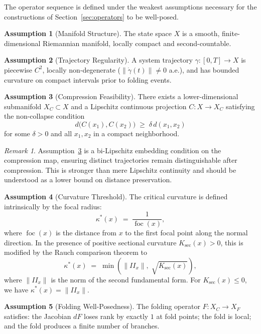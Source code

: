 \documentclass[12pt, oneside]{book}
\theoremstyle{plain}
\theoremstyle{definition}
\newtheorem{assumption}{Assumption}[section]
\theoremstyle{remark}
\newtheorem{remark}{Remark}[section]
\begin{document}
The operator sequence is defined under the weakest assumptions
necessary for the constructions of Section~\ref{sec:operators} to be
well-posed.

\begin{assumption}[Manifold Structure]\label{ass:manifold}
The state space $X$ is a smooth, finite-dimensional Riemannian
manifold, locally compact and second-countable.
\end{assumption}

\begin{assumption}[Trajectory Regularity]\label{ass:traj}
A system trajectory $\gamma : [0,T] \to X$ is piecewise $C^2$,
locally non-degenerate ($\|\dot\gamma(t)\| \neq 0$ a.e.), and has
bounded curvature on compact intervals prior to folding events.
\end{assumption}

\begin{assumption}[Compression Feasibility]\label{ass:compress}
There exists a lower-dimensional submanifold $X_C \subset X$ and a
Lipschitz continuous projection $C : X \to X_C$ satisfying the
non-collapse condition
\[
d\bigl(C(x_1), C(x_2)\bigr) \;\ge\; \delta\, d(x_1, x_2)
\]
for some $\delta > 0$ and all $x_1, x_2$ in a compact neighborhood.
\end{assumption}

\begin{remark}
Assumption~\ref{ass:compress} is a bi-Lipschitz embedding condition
on the compression map, ensuring distinct trajectories remain
distinguishable after compression. This is stronger than mere Lipschitz
continuity and should be understood as a lower bound on distance
preservation.
\end{remark}

\begin{assumption}[Curvature Threshold]\label{ass:kappa}
The critical curvature is defined intrinsically by the focal radius:
\[
\kappa^*(x) \;=\; \frac{1}{\operatorname{foc}(x)},
\]
where $\operatorname{foc}(x)$ is the distance from $x$ to the first
focal point along the normal direction. In the presence of positive
sectional curvature $K_{\mathrm{sec}}(x) > 0$, this is modified by
the Rauch comparison theorem to
\[
\kappa^*(x) \;=\; \min\!\left(\|II_x\|,\;
  \sqrt{K_{\mathrm{sec}}(x)}\right),
\]
where $\|II_x\|$ is the norm of the second fundamental form.
For $K_{\mathrm{sec}}(x) \le 0$, we have $\kappa^*(x) = \|II_x\|$.
\end{assumption}

\begin{assumption}[Folding Well-Posedness]\label{ass:fold}
The folding operator $F : X_C \to X_F$ satisfies: the Jacobian $dF$
loses rank by exactly $1$ at fold points; the fold is local; and the
fold produces a finite number of branches.
\end{assumption}
\end{document}
